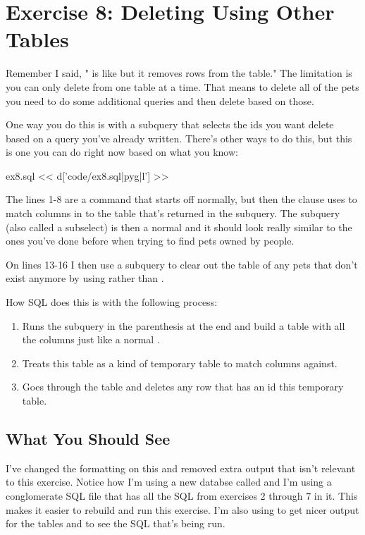 \chapter{Exercise 8: Deleting Using Other Tables}

Remember I said, " is like  but it removes
rows from the table."  The limitation is you can only delete from one
table at a time.  That means to delete all of the pets you need to do
some additional queries and then delete based on those.

One way you do this is with a subquery that selects the ids you want
delete based on a query you've already written.  There's other ways
to do this, but this is one you can do right now based on what you 
know:

\begin{code}{ex8.sql}
<< d['code/ex8.sql|pyg|l'] >>
\end{code}

The lines 1-8 are a  command that starts off normally, but
then the  clause uses  to match  columns
in  to the table that's returned in the subquery.  The subquery
(also called a subselect) is then a normal  and it should
look really similar to the ones you've done before when trying to find
pets owned by people.

On lines 13-16 I then use a subquery to clear out the 
table of any pets that don't exist anymore by using  rather
than .

How SQL does this is with the following process:

\begin{enumerate}
\item Runs the subquery in the parenthesis at the end and build a table
    with all the columns just like a normal .
\item Treats this table as a kind of temporary table to match 
    columns against.
\item Goes through the  table and deletes any row that has an id
     this temporary table.
\end{enumerate}

\section{What You Should See}

I've changed the formatting on this and removed extra output that isn't
relevant to this exercise.  Notice how I'm using a new databse called
 and I'm using a conglomerate SQL file that has all the
SQL from exercises 2 through 7 in it.  This makes it easier to rebuild
and run this exercise.  I'm also using 
to get nicer output for the tables and to see the SQL that's being run.

